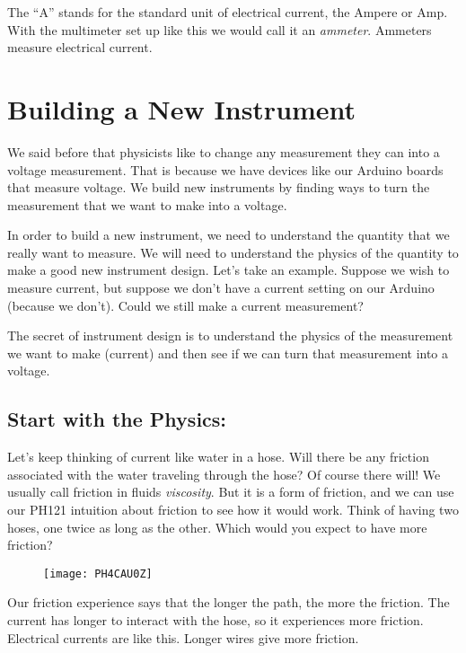 The ``A'' stands for the standard unit of electrical current, the Ampere or Amp. With the multimeter set up like this we would call it an \emph{ammeter}. Ammeters measure electrical current.

\section{Building a New Instrument} \label{New_Instrument_Section}

We said before that physicists like to change any measurement they can into a voltage measurement. That is because we have devices like our Arduino boards that measure voltage. We build new instruments by finding ways to turn the measurement that we want to make into a voltage.

In order to build a new instrument, we need to understand the quantity that we really want to measure. We will need to understand the physics of the quantity to make a good new instrument design. Let's take an example. Suppose we wish to measure current, but suppose we don't have a current setting on our Arduino (because we don't). Could we still make a current measurement?

The secret of instrument design is to understand the physics of the measurement we want to make (current) and then see if we can turn that measurement into a voltage.

\subsection{Start with the Physics:}

Let's keep thinking of current like water in a hose. Will there be any friction associated with the water traveling through the hose? Of course there will! We usually call friction in fluids \emph{viscosity}. But it is a form of friction, and we can use our PH121 intuition about friction to see how it would work. Think of having two hoses, one twice as long as the other. Which would you expect to have more friction? 

\begin{figure}[h!]
	\centering
    \texttt{[image: PH4CAU0Z]}
\end{figure}

Our friction experience says that the longer the path, the more the friction. The current has longer to interact with the hose, so it experiences more friction. Electrical currents are like this. Longer wires give more friction.

